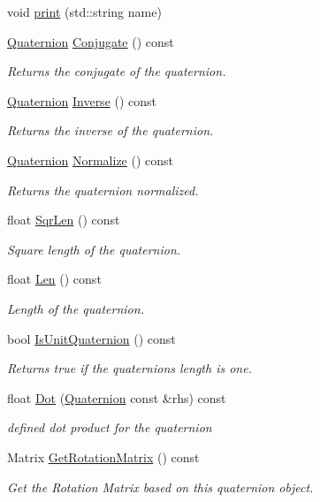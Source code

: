 \begin{DoxyCompactItemize}
void \hyperlink{structMathUtil_1_1Quaternion_abd27342d40655826b293ccfc382601d5}{print} (std\+::string name)
\item 
\hyperlink{structMathUtil_1_1Quaternion}{Quaternion} \hyperlink{structMathUtil_1_1Quaternion_a16e3c04798dc34eeb34d497123a15eed}{Conjugate} () const
\begin{DoxyCompactList}\small\item\em Returns the conjugate of the quaternion. \end{DoxyCompactList}\item 
\hyperlink{structMathUtil_1_1Quaternion}{Quaternion} \hyperlink{structMathUtil_1_1Quaternion_aa66406ea6183ad19154410b2507567c2}{Inverse} () const
\begin{DoxyCompactList}\small\item\em Returns the inverse of the quaternion. \end{DoxyCompactList}\item 
\hyperlink{structMathUtil_1_1Quaternion}{Quaternion} \hyperlink{structMathUtil_1_1Quaternion_a305895ae4783d67d6972fe51b930eaea}{Normalize} () const
\begin{DoxyCompactList}\small\item\em Returns the quaternion normalized. \end{DoxyCompactList}\item 
float \hyperlink{structMathUtil_1_1Quaternion_ab497c4a543f601fda6d4bc141140cbf0}{Sqr\+Len} () const
\begin{DoxyCompactList}\small\item\em Square length of the quaternion. \end{DoxyCompactList}\item 
float \hyperlink{structMathUtil_1_1Quaternion_a96a16f91e1c46f84f21134e4b46f733d}{Len} () const
\begin{DoxyCompactList}\small\item\em Length of the quaternion. \end{DoxyCompactList}\item 
bool \hyperlink{structMathUtil_1_1Quaternion_a78501552147c626d5096ef1039a1c254}{Is\+Unit\+Quaternion} () const
\begin{DoxyCompactList}\small\item\em Returns true if the quaternions length is one. \end{DoxyCompactList}\item 
float \hyperlink{structMathUtil_1_1Quaternion_ae213f1160bfaf3de32d1e01681ed64c0}{Dot} (\hyperlink{structMathUtil_1_1Quaternion}{Quaternion} const \&rhs) const
\begin{DoxyCompactList}\small\item\em defined dot product for the quaternion \end{DoxyCompactList}\item 
Matrix \hyperlink{structMathUtil_1_1Quaternion_a331cf32ec3767d734e0ad0ebc9e3cccb}{Get\+Rotation\+Matrix} () const
\begin{DoxyCompactList}\small\item\em Get the Rotation Matrix based on this quaternion object. \end{DoxyCompactList}\end{DoxyCompactItemize}

